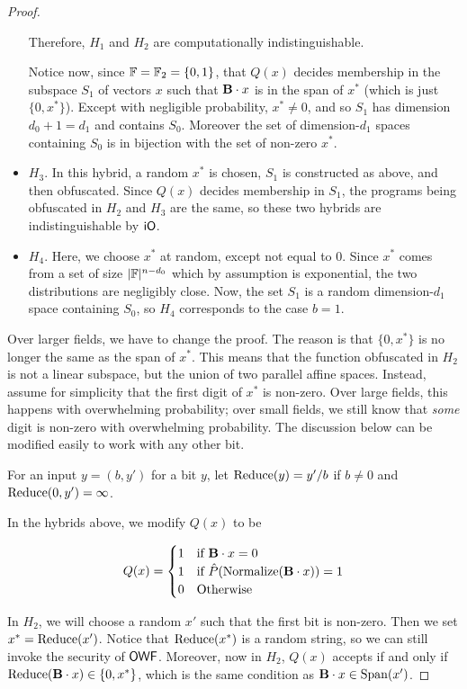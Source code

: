 \begin{proof}
\begin{itemize}
		Therefore, $H_1$ and $H_2$ are computationally indistinguishable.
		
		Notice now, since ${\mathbb F}={\mathbb F}_2=\{0,1\}$, that $Q(x)$ decides membership in the subspace $S_1$ of vectors $x$ such that ${\mathbf{B}}\cdot x$ is in the span of $x^*$ (which is just $\{0,x^*\}$).  Except with negligible probability, $x^*\neq 0$, and so $S_1$ has dimension $d_0+1=d_1$ and contains $S_0$.  Moreover the set of dimension-$d_1$ spaces containing $S_0$ is in bijection with the set of non-zero $x^*$.
		
		\item $H_3$.  In this hybrid, a random $x^*$ is chosen, $S_1$ is constructed as above, and then obfuscated.  Since $Q(x)$ decides membership in $S_1$, the programs being obfuscated in $H_2$ and $H_3$ are the same, so these two hybrids are indistinguishable by ${\sf iO}$.  
		
		
		\item $H_4$.  Here, we choose $x^*$ at random, except not equal to 0.  Since $x^*$ comes from a set of size $|{\mathbb F}|^{n-d_0}$ which by assumption is exponential, the two distributions are negligibly close.  Now, the set $S_1$ is a random dimension-$d_1$ space containing $S_0$, so $H_4$ corresponds to the case $b=1$.
	\end{itemize}


	
	Over larger fields, we have to change the proof.  The reason is that $\{0,x^*\}$ is no longer the same as the span of $x^*$.  This means that the function obfuscated in $H_2$ is not a linear subspace, but the union of two parallel affine spaces.  Instead, assume for simplicity that the first digit of $x^*$ is non-zero.  Over large fields, this happens with overwhelming probability; over small fields, we still know that \emph{some} digit is non-zero with overwhelming probability.  The discussion below can be modified easily to work with any other bit.

	For an input $y=(b,y')$ for a bit $y$, let ${\rm Reduce}(y)=y'/b$ if $b\neq 0$ and ${\rm Reduce}(0,y')=\infty$.  

	In the hybrids above, we modify $Q(x)$ to be 

	\[Q(x)=\begin{cases}1&\text{if }{\mathbf{B}}\cdot x = 0\\1&\text{if }\hat{P}({\rm Normalize}({\mathbf{B}}\cdot x))=1\\0&\text{Otherwise}\end{cases}\]

	In $H_2$, we will choose a random $x'$ such that the first bit is non-zero.  Then we set $x^*={\rm Reduce}(x')$.  Notice that ${\rm Reduce}(x^*)$ is a random string, so we can still invoke the security of ${\sf OWF}$.  Moreover, now in $H_2$, $Q(x)$ accepts if and only if ${\rm Reduce}({\mathbf{B}}\cdot x)\in\{0,x^*\}$, which is the same condition as ${\mathbf{B}}\cdot x\in {\rm Span}(x')$.  
	

\end{proof}
